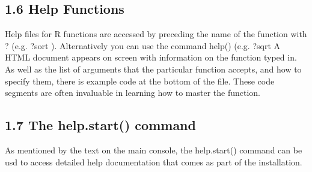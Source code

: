 \subsection{1.6 Help Functions}
Help files for R functions are accessed by preceding the name of the function with ? (e.g. ?sort
). Alternatively you can use the command help() (e.g. ?sqrt
A HTML document appears on screen with information on the function typed in. As well
as the list of arguments that the particular function accepts, and how to specify them, there is
example code at the bottom of the file. These code segments are often invaluable in learning
how to master the function.

\subsection{1.7 The help.start() command}
As mentioned by the text on the main console, the help.start() command can be usd to
access detailed help documentation that comes as part of the installation.


